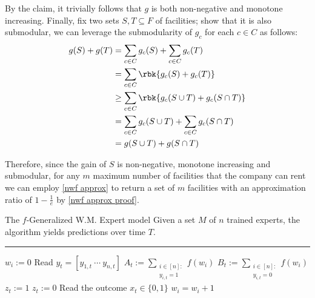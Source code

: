 \documentclass[a4paper, 12pt]{report}
\begin{document}
{        By the claim, it trivially follows that $g$ is both non-negative and monotone increasing. Finally, fix two sets $S, T \subseteq F$ of facilities; show that it is also submodular, we can leverage the submodularity of $g_c$ for each $c \in C$ as follows:
        \begin{equation*}
            \begin{split}
                g(S) + g(T) &= \sum_{c \in C}{g_c(S)} + \sum_{c \in C}{g_c(T)} \\
                            &= \sum_{c \in C}{\rbk{g_c(S) + g_c(T)}} \\
                            &\ge \sum_{c \in C}{\rbk{g_c(S \cup T) + g_c(S \cap T)}} \\
                            &= \sum_{c \in C}{g_c(S \cup T)} + \sum_{c \in C}{g_c(S \cap T)} \\
                            &= g(S \cup T) + g(S \cap T)
            \end{split}
        \end{equation*}

        Therefore, since the gain of $S$ is non-negative, monotone increasing and submodular, for any $m$ maximum number of facilities that the company can rent we can employ \cref{nwf approx} to return a set of $m$ facilities with an approximation ratio of $1 - \tfrac{1}{e}$ by \cref{nwf approx proof}.
    }

    \begin{framedalgo}{The $f$-Generalized W.M. Expert model}
        Given a set $M$ of $n$ trained experts, the algorithm yields predictions over time $T$. \\
        \hrule

        \quad
        \begin{algorithmic}[1]
                    \State $w_i := 0$
                \EndFor
                    \State Read $y_t = [y_{1, t} \ \cdots \ y_{n, t}]$
                    \State $A_t := \sum\limits_{\substack{i \in [n] : \\ y_{i , t} = 1}}{f(w_i)}$
                    \State $B_t := \sum\limits_{\substack{i \in [n] : \\ y_{i , t} = 0}}{f(w_i)}$
                        \State $z_t := 1$
                    \Else
                        \State $z_t := 0$
                    \EndIf
                    \State Read the outcome $x_t \in \{0, 1\}$
                                \State $w_i = w_i + 1$
                            \EndIf
                        \EndFor
                    \EndIf
                \EndFor
            \EndFunction
        \end{algorithmic}
    \end{framedalgo}
\end{document}
